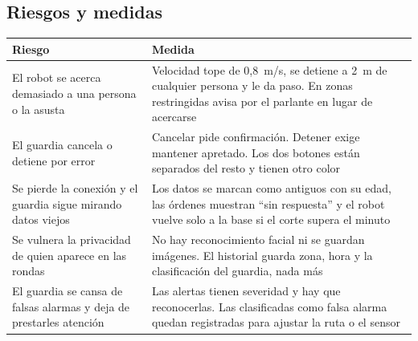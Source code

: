 \subsection{Riesgos y medidas}

\begin{table}[H]
\centering\small
\begin{tabularx}{\textwidth}{@{}L L@{}}
\toprule
\textbf{Riesgo} & \textbf{Medida} \\
\midrule
El robot se acerca demasiado a una persona o la asusta & Velocidad tope de 0,8~m/s, se detiene a 2~m de cualquier persona y le da paso. En zonas restringidas avisa por el parlante en lugar de acercarse \\
El guardia cancela o detiene por error & Cancelar pide confirmación. Detener exige mantener apretado. Los dos botones están separados del resto y tienen otro color \\
Se pierde la conexión y el guardia sigue mirando datos viejos & Los datos se marcan como antiguos con su edad, las órdenes muestran ``sin respuesta'' y el robot vuelve solo a la base si el corte supera el minuto \\
Se vulnera la privacidad de quien aparece en las rondas & No hay reconocimiento facial ni se guardan imágenes. El historial guarda zona, hora y la clasificación del guardia, nada más \\
El guardia se cansa de falsas alarmas y deja de prestarles atención & Las alertas tienen severidad y hay que reconocerlas. Las clasificadas como falsa alarma quedan registradas para ajustar la ruta o el sensor \\
\bottomrule
\end{tabularx}
\end{table}
